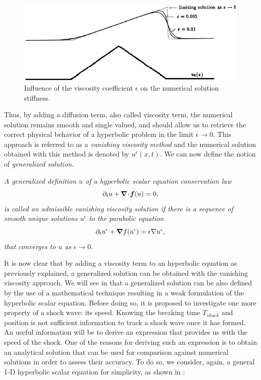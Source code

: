 %
\begin{figure}[H]
\centering
\includegraphics[width=\textwidth]{figures/effect_of_epsilon.png}
\caption{Influence of the viscosity coefficient $\epsilon$ on the numerical solution stiffness.}
\label{fig:epsilon}
\end{figure}
%
Thus, by adding a diffusion term, also called viscosity term, the numerical solution remains smooth and single valued, and should allow us to retrieve the correct physical behavior of a hyperbolic problem in the limit $\epsilon \to 0$. This approach is referred to as a \emph{vanishing viscosity method} and the numerical solution obtained with this method is denoted by $u^{\epsilon}(x,t)$. We can now define the notion of \emph{generalized solution}. 
%
\begin{definition}
\emph{
A generalized definition $u$ of a hyperbolic scalar equation conservation law 
\begin{equation}
\partial_t u + \boldsymbol{\nabla}\! \cdot \! \boldsymbol f(u) = 0, \nonumber
\end{equation}
is called an admissible vanishing viscosity solution if there is a sequence of smooth unique solutions $u^{\epsilon}$ to the parabolic equation 
\begin{equation}
\partial_t u^{\epsilon} +  \boldsymbol{\nabla} f(u^{\epsilon}) = \epsilon \nabla u^{\epsilon}, \nonumber
\end{equation}
that converges to $u$ as $\epsilon \to 0$.}
\end{definition}
%
It is now clear that by adding a viscosity term to an hyperbolic equation as previously explained, a generalized solution can be obtained with the vanishing viscosity approach. We will see in  that a generalized solution can be also defined by the use of a mathematical technique resulting in a weak formulation of the hyperbolic scalar equation. Before doing so, it is proposed to investigate one more property of a shock wave: its speed. Knowing the breaking time $T_{shock}$ and position is not sufficient information to track a shock wave once it has formed. An useful information will be to derive an expression that provides us with the speed of the shock. One of the reasons for deriving such an expression is to obtain an analytical solution that can be used for comparison against numerical solutions in order to assess their accuracy. To do so, we consider, again, a general 1-D hyperbolic scalar equation for simplicity, as shown in :
